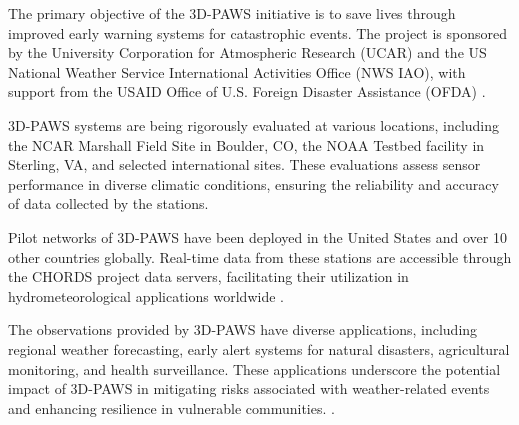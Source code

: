 The primary objective of the 3D-PAWS initiative is to save lives through improved early warning systems for catastrophic events. The project is sponsored by the University Corporation for Atmospheric Research (UCAR) and the US National Weather Service International Activities Office (NWS IAO), with support from the USAID Office of U.S. Foreign Disaster Assistance (OFDA) \cite{3dpaws_manual}.

3D-PAWS systems are being rigorously evaluated at various locations, including the NCAR Marshall Field Site in Boulder, CO, the NOAA Testbed facility in Sterling, VA, and selected international sites. These evaluations assess sensor performance in diverse climatic conditions, ensuring the reliability and accuracy of data collected by the stations.

Pilot networks of 3D-PAWS have been deployed in the United States and over 10 other countries globally. Real-time data from these stations are accessible through the CHORDS project data servers, facilitating their utilization in hydrometeorological applications worldwide \cite{3dpaws_manual}.

The observations provided by 3D-PAWS have diverse applications, including regional weather forecasting, early alert systems for natural disasters, agricultural monitoring, and health surveillance. These applications underscore the potential impact of 3D-PAWS in mitigating risks associated with weather-related events and enhancing resilience in vulnerable communities. \cite{3dpaws_manual}.